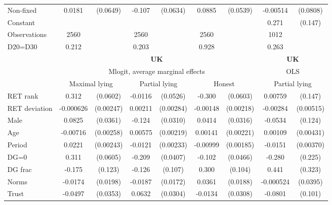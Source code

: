 \begin{tabular}{l|cccccc|cc}
Non-fixed     &   0.0181         & (0.0649)&   -0.107\sym{*}  & (0.0634)&   0.0885         & (0.0539)& -0.00514         & (0.0808)\\
Constant        &                  &         &                  &         &                  &         &    0.271\sym{*}  &  (0.147)\\
\hline
Observations    &     2560         &         &     2560         &         &     2560         &         &     1012         &         \\
D20=D30         &    0.212         &         &    0.203         &         &    0.928         &         &    0.263         &         \\
\hline\hline
&\multicolumn{6}{c|}{\bf UK}&\multicolumn{2}{c}{\bf UK}\\ &\multicolumn{6}{c|}{Mlogit, average marginal effects }&\multicolumn{2}{c}{OLS}\\
                &\multicolumn{2}{c}{Maximal lying}&\multicolumn{2}{c}{Partial lying}&\multicolumn{2}{c|}{Honest}  &\multicolumn{2}{c}{Partial lying}\\
\hline
RET rank        &    0.312\sym{***}& (0.0602)&  -0.0116         & (0.0526)&   -0.300\sym{***}& (0.0603)&  0.00759         &  (0.147)\\
RET deviation   &-0.000626         &(0.00247)&  0.00211         &(0.00284)& -0.00148         &(0.00218)& -0.00284         &(0.00515)\\
Male            &   0.0825\sym{**} & (0.0361)&   -0.124\sym{***}& (0.0310)&   0.0414         & (0.0316)&  -0.0534         &  (0.124)\\
Age             & -0.00716\sym{***}&(0.00258)&  0.00575\sym{***}&(0.00219)&  0.00141         &(0.00221)&  0.00109         &(0.00431)\\
Period          &   0.0221\sym{***}&(0.00243)&  -0.0121\sym{***}&(0.00233)& -0.00999\sym{***}&(0.00185)&  -0.0151\sym{***}&(0.00370)\\
DG=0          &    0.311\sym{***}& (0.0605)&   -0.209\sym{***}& (0.0407)&   -0.102\sym{**} & (0.0466)&   -0.280         &  (0.225)\\
DG frac         &   -0.175         &  (0.123)&   -0.126         &  (0.107)&    0.300\sym{***}&  (0.104)&    0.441         &  (0.323)\\
Norms           &  -0.0174         & (0.0198)&  -0.0187         & (0.0172)&   0.0361\sym{*}  & (0.0188)&-0.000524         & (0.0395)\\
Trust         &  -0.0497         & (0.0353)&   0.0632\sym{**} & (0.0304)&  -0.0134         & (0.0308)&  -0.0801         &  (0.101)\\

\end{tabular}

